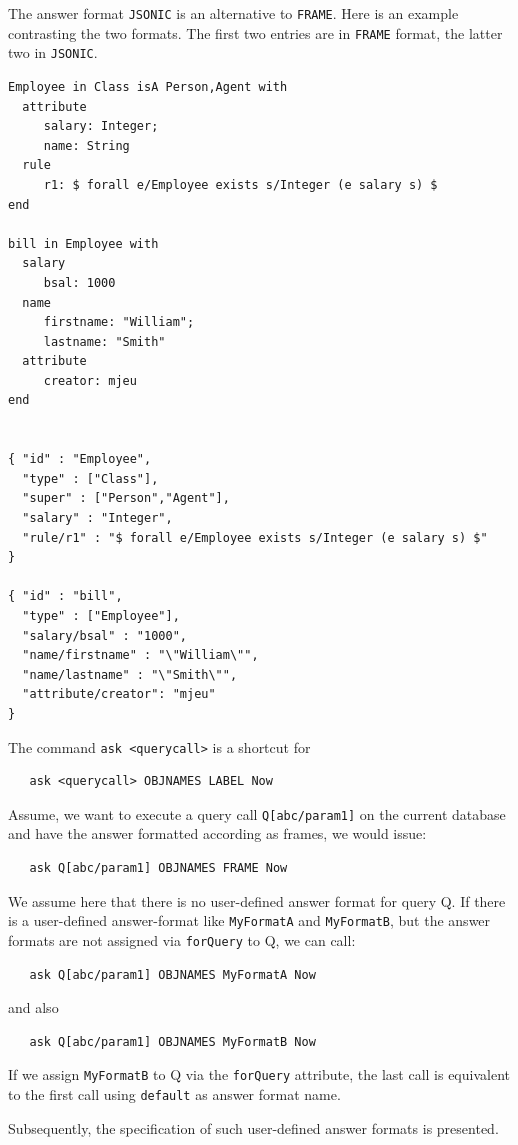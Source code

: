 The answer format {\tt JSONIC} is an alternative to {\tt FRAME}. Here is an example contrasting
the two formats. The first two entries are in {\tt FRAME} format, the latter two in {\tt JSONIC}.


\begin{verbatim}
Employee in Class isA Person,Agent with
  attribute
     salary: Integer;
     name: String
  rule
     r1: $ forall e/Employee exists s/Integer (e salary s) $
end

bill in Employee with
  salary
     bsal: 1000
  name
     firstname: "William";
     lastname: "Smith"
  attribute
     creator: mjeu
end


{ "id" : "Employee",
  "type" : ["Class"],
  "super" : ["Person","Agent"],
  "salary" : "Integer",
  "rule/r1" : "$ forall e/Employee exists s/Integer (e salary s) $"
}

{ "id" : "bill",
  "type" : ["Employee"],
  "salary/bsal" : "1000",
  "name/firstname" : "\"William\"",
  "name/lastname" : "\"Smith\"",
  "attribute/creator": "mjeu"
}
\end{verbatim}




The command {\tt ask <querycall>}
is a shortcut for
\begin{verbatim}
   ask <querycall> OBJNAMES LABEL Now
\end{verbatim}

Assume, we want to execute a query call {\tt Q[abc/param1]} on the current database and
have the answer formatted according as frames, we would issue:
\begin{verbatim}
   ask Q[abc/param1] OBJNAMES FRAME Now
\end{verbatim}
We assume here that there is no user-defined answer format for query Q. If there is a 
user-defined answer-format like {\tt MyFormatA} and {\tt MyFormatB}, but the answer formats are not 
assigned via {\tt forQuery} to Q, we can call:
\begin{verbatim}
   ask Q[abc/param1] OBJNAMES MyFormatA Now
\end{verbatim}
and also
\begin{verbatim}
   ask Q[abc/param1] OBJNAMES MyFormatB Now
\end{verbatim}
If we assign {\tt MyFormatB} to Q via the {\tt forQuery} attribute, the last call is equivalent to
the first call using {\tt default} as answer format name.

Subsequently, the specification of such user-defined answer formats is presented.


